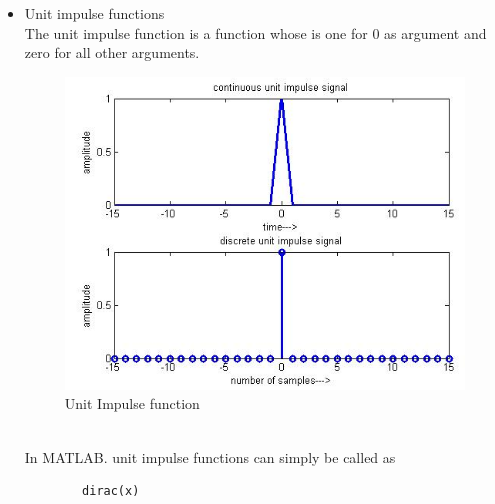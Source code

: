 \documentclass[12pt]{article}
\begin{document}
\begin{itemize}
    \pagebreak
    \item Unit impulse functions\\
    The unit impulse function is a function whose is one for 0 as argument and zero for all other arguments.
    \begin{figure}[h!]
        \centering
        \includegraphics[scale = 0.7]{labss/Lab2_TH_Impulse.PNG}
        \caption{Unit Impulse function} 
    \end{figure}\\
    In MATLAB. unit impulse functions can simply be called as 
    \begin{verbatim}
        dirac(x)
    \end{verbatim}
\end{itemize}
\pagebreak
\end{document}
